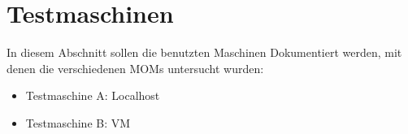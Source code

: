 
\section{Testmaschinen}
\label{sec:testmachine}
In diesem Abschnitt sollen die benutzten Maschinen Dokumentiert werden, mit denen die verschiedenen MOMs untersucht wurden:
\begin{itemize}
    \item Testmaschine A: Localhost
    \item Testmaschine B: VM
\end{itemize}

